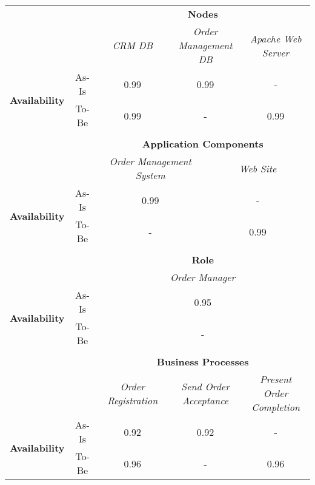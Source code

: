 \begin{table}[H]
	\centering
	\begin{tabular}{|c|c|p{2cm}|p{2.5cm}|p{2.5cm}|p{2.5cm}|}
		\cline{3-6}

		\multicolumn{2}{c}{} & \multicolumn{4}{|c|}{\textbf{Nodes}} \\ \cline{3-6}
		\multicolumn{2}{c|}{} & \multicolumn{1}{c|}{\textsl{CRM DB}} & \multicolumn{2}{c|}{\textsl{Order Management DB}} & \multicolumn{1}{c|}{\textsl{Apache Web Server}} \\
		\hline
		\multirow{2}{*}{\textbf{Availability}} & As-Is & \multicolumn{1}{c|}{0.99} & \multicolumn{2}{c|}{0.99}& \multicolumn{1}{c|}{-} \\ \cline{2-6}
		& To-Be & \multicolumn{1}{c|}{0.99} & \multicolumn{2}{c|}{-}& \multicolumn{1}{c|}{0.99} \\ \hline
		
		\multicolumn{6}{c}{} \\ \cline{3-6}
		\multicolumn{2}{c}{} & \multicolumn{4}{|c|}{\textbf{Application Components}} \\ \cline{3-6}
		\multicolumn{2}{c|}{} & \multicolumn{2}{c|}{\textsl{Order Management System}} & \multicolumn{2}{c|}{\textsl{Web Site}}  \\
		\hline
		\multirow{2}{*}{\textbf{Availability}} & As-Is & \multicolumn{2}{c|}{0.99} & \multicolumn{2}{c|}{-} \\ \cline{2-6}
		& To-Be & \multicolumn{2}{c|}{-} & \multicolumn{2}{c|}{0.99} \\ \hline
		
		\multicolumn{6}{c}{} \\ \cline{3-6}
		\multicolumn{2}{c}{} & \multicolumn{4}{|c|}{\textbf{Role}} \\ \cline{3-6}
		\multicolumn{2}{c|}{} & \multicolumn{4}{c|}{\textsl{Order Manager}} \\
		\hline
		\multirow{2}{*}{\textbf{Availability}} &As-Is & \multicolumn{4}{c|}{0.95}  \\ \cline{2-6}
		& To-Be & \multicolumn{4}{c|}{-}\\ \hline

		\multicolumn{6}{c}{} \\ \cline{3-6}
		\multicolumn{2}{c}{} & \multicolumn{4}{|c|}{\textbf{Business Processes}} \\ \cline{3-6}
		\multicolumn{2}{c|}{} & \multicolumn{1}{c|}{\textsl{Order Registration}} & \multicolumn{2}{c|}{\textsl{Send Order Acceptance}} & \multicolumn{1}{c|}{\textsl{Present Order Completion}}\\
		\hline
		\multirow{2}{*}{\textbf{Availability}} & As-Is & \multicolumn{1}{c|}{0.92} & \multicolumn{2}{c|}{0.92} & \multicolumn{1}{c|}{-} \\ \cline{2-6}
		& To-Be & \multicolumn{1}{c|}{0.96} & \multicolumn{2}{c|}{-} & \multicolumn{1}{c|}{0.96} \\ \hline


\end{tabular}
\end{table}
